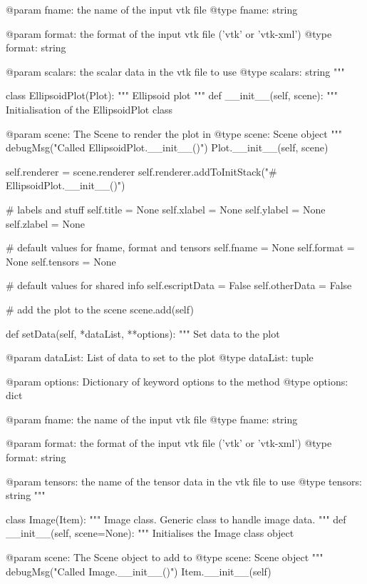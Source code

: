 \begin{python}
\begin{python}
\begin{verbose}
        @param fname: the name of the input vtk file
        @type fname: string

        @param format: the format of the input vtk file ('vtk' or 'vtk-xml')
        @type format: string

        @param scalars: the scalar data in the vtk file to use
        @type scalars: string
        """

class EllipsoidPlot(Plot):
    """
    Ellipsoid plot
    """
    def __init__(self, scene):
        """
        Initialisation of the EllipsoidPlot class

        @param scene: The Scene to render the plot in
        @type scene: Scene object
        """
        debugMsg("Called EllipsoidPlot.__init__()")
        Plot.__init__(self, scene)

        self.renderer = scene.renderer
        self.renderer.addToInitStack("# EllipsoidPlot.__init__()")

        # labels and stuff
        self.title = None
        self.xlabel = None
        self.ylabel = None
        self.zlabel = None
        
        # default values for fname, format and tensors
        self.fname = None
        self.format = None
	self.tensors = None

	# default values for shared info
	self.escriptData = False
	self.otherData = False

        # add the plot to the scene
        scene.add(self)

    def setData(self, *dataList, **options):
        """
        Set data to the plot

        @param dataList: List of data to set to the plot
        @type dataList: tuple

        @param options: Dictionary of keyword options to the method
        @type options: dict

	@param fname: the name of the input vtk file
	@type fname: string

	@param format: the format of the input vtk file ('vtk' or 'vtk-xml')
	@type format: string

	@param tensors: the name of the tensor data in the vtk file to use
	@type tensors: string
        """

class Image(Item):
    """
    Image class.  Generic class to handle image data.
    """
    def __init__(self, scene=None):
        """
        Initialises the Image class object
        
        @param scene: The Scene object to add to
        @type scene: Scene object
        """
        debugMsg("Called Image.__init__()")
        Item.__init__(self)


\end{verbose}
\end{python}
\end{python}
